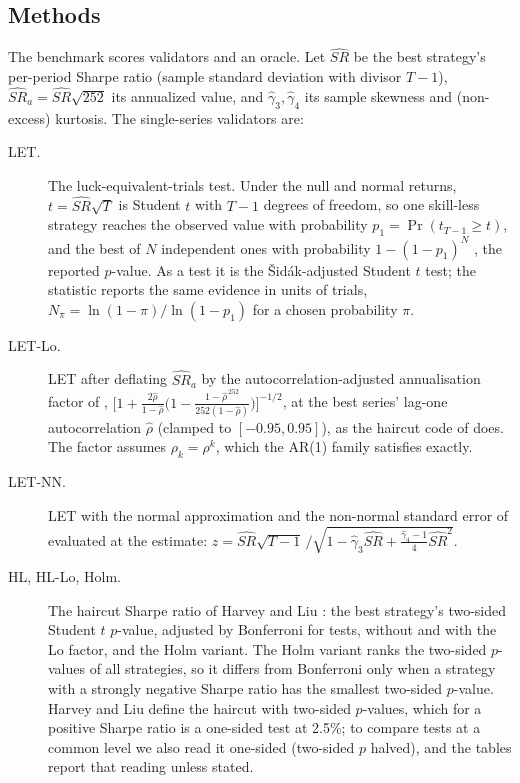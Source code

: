 \subsection{Methods}
The benchmark scores  validators and an oracle. Let $\widehat{SR}$ be the best strategy's per-period Sharpe ratio (sample standard deviation with divisor $T-1$), $\widehat{SR}_a=\widehat{SR}\sqrt{252}$ its annualized value, and $\hat\gamma_3,\hat\gamma_4$ its sample skewness and (non-excess) kurtosis. The single-series validators are:

\begin{description}
  \item[LET.] The luck-equivalent-trials test. Under the null and normal returns, $t=\widehat{SR}\sqrt{T}$ is Student $t$ with $T-1$ degrees of freedom, so one skill-less strategy reaches the observed value with probability $p_1=\Pr(t_{T-1}\ge t)$, and the best of $N$ independent ones with probability $1-(1-p_1)^N$ \citep{sidak1967}, the reported $p$-value. As a test it is the \v{S}id\'ak-adjusted Student $t$ test; the statistic reports the same evidence in units of trials, $N_\pi=\ln(1-\pi)/\ln(1-p_1)$ for a chosen probability $\pi$.
  \item[LET-Lo.] LET after deflating $\widehat{SR}_a$ by the autocorrelation-adjusted annualisation factor of \citet{lo2002sharpe}, $\big[1+\tfrac{2\hat\rho}{1-\hat\rho}\big(1-\tfrac{1-\hat\rho^{\,252}}{252(1-\hat\rho)}\big)\big]^{-1/2}$, at the best series' lag-one autocorrelation $\hat\rho$ (clamped to $[-0.95,0.95]$), as the haircut code of \citet{harvey2015backtesting} does. The factor assumes $\rho_k=\rho^k$, which the AR(1) family satisfies exactly.
  \item[LET-NN.] LET with the normal approximation and the non-normal standard error of \citet{mertens2002comments} evaluated at the estimate: $z=\widehat{SR}\sqrt{T-1}\,/\sqrt{1-\hat\gamma_3\widehat{SR}+\tfrac{\hat\gamma_4-1}{4}\widehat{SR}^2}$.
  \item[HL, HL-Lo, Holm.] The haircut Sharpe ratio of Harvey and Liu \citep{harvey2015backtesting}: the best strategy's two-sided Student $t$ $p$-value, adjusted by Bonferroni for  tests, without and with the Lo factor, and the Holm \citep{holm1979} variant. The Holm variant ranks the two-sided $p$-values of all  strategies, so it differs from Bonferroni only when a strategy with a strongly negative Sharpe ratio has the smallest two-sided $p$-value. Harvey and Liu define the haircut with two-sided $p$-values, which for a positive Sharpe ratio is a one-sided test at 2.5\%; to compare tests at a common level we also read it one-sided (two-sided $p$ halved), and the tables report that reading unless stated.

\end{description}
